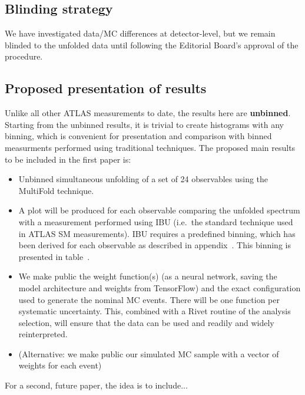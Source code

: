 \subsection{Blinding strategy}

We have investigated data/MC differences at detector-level, but we remain blinded to the unfolded data until following the Editorial Board's approval of the procedure.

\subsection{Proposed presentation of results}

Unlike all other ATLAS measurements to date, the results here are \textbf{unbinned}. 
Starting from the unbinned results, it is trivial to create histograms with any binning, which is convenient for presentation and comparison with binned measurments performed using traditional techniques. 
The proposed main results to be included in the first paper is:


\begin{itemize}
\item 
  Unbinned simultaneous unfolding of a set of 24 observables using the MultiFold technique.  
\item 
   A plot will be produced for each observable comparing the unfolded spectrum with a measurement performed using IBU (i.e.\ the standard technique used in ATLAS SM measurements).
   IBU requires a predefined binning, which has been derived for each observable as described in appendix~. This binning is presented in table~.
\item 
  We make public the weight function(s) (as a neural network, saving the model architecture and weights from TensorFlow) and the exact configuration used to generate the nominal MC events.  There will be one function per systematic uncertainty.  This, combined with a Rivet routine of the analysis selection, will ensure that the data can be used and readily and widely reinterpreted.
\item (Alternative: we make public our simulated MC sample with a vector of weights for each event)
\end{itemize}




For a second, future paper, the idea is to include...
